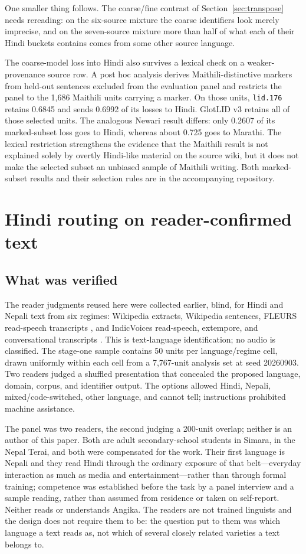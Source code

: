 \documentclass[final]{clv2025}
\newcommand{\lab}[1]{\texttt{#1}}
\begin{document}
One smaller thing follows. The coarse/fine contrast of Section~\ref{sec:transpose} needs rereading: on the six-source mixture the coarse identifiers look merely imprecise, and on the seven-source mixture more than half of what each of their Hindi buckets contains comes from some other source language.

The coarse-model loss into Hindi also survives a lexical check on a weaker-provenance source row. A post hoc analysis derives Maithili-distinctive markers from held-out sentences excluded from the evaluation panel and restricts the panel to the 1,686 Maithili units carrying a marker. On those units, \lab{lid.176} retains 0.6845 and sends 0.6992 of its losses to Hindi. GlotLID v3 retains all of those selected units. The analogous Newari result differs: only 0.2607 of its marked-subset loss goes to Hindi, whereas about 0.725 goes to Marathi. The lexical restriction strengthens the evidence that the Maithili result is not explained solely by overtly Hindi-like material on the source wiki, but it does not make the selected subset an unbiased sample of Maithili writing. Both marked-subset results and their selection rules are in the accompanying repository.

\section{Hindi routing on reader-confirmed text}\label{sec:human}

\subsection{What was verified}

The reader judgments reused here were collected earlier, blind, for Hindi and Nepali text from six regimes: Wikipedia extracts, Wikipedia sentences, FLEURS read-speech transcripts \citep{conneau2022fleurs}, and IndicVoices read-speech, extempore, and conversational transcripts \citep{javed2024indicvoices}. This is text-language identification; no audio is classified. The stage-one sample contains 50 units per language/regime cell, drawn uniformly within each cell from a 7,767-unit analysis set at seed 20260903. Two readers judged a shuffled presentation that concealed the proposed language, domain, corpus, and identifier output. The options allowed Hindi, Nepali, mixed/code-switched, other language, and cannot tell; instructions prohibited machine assistance.

The panel was two readers, the second judging a 200-unit overlap; neither is an author of this paper. Both are adult secondary-school students in Simara, in the Nepal Terai, and both were compensated for the work. Their first language is Nepali and they read Hindi through the ordinary exposure of that belt---everyday interaction as much as media and entertainment---rather than through formal training; competence was established before the task by a panel interview and a sample reading, rather than assumed from residence or taken on self-report. Neither reads or understands Angika. The readers are not trained linguists and the design does not require them to be: the question put to them was which language a text reads as, not which of several closely related varieties a text belongs to.
\end{document}

